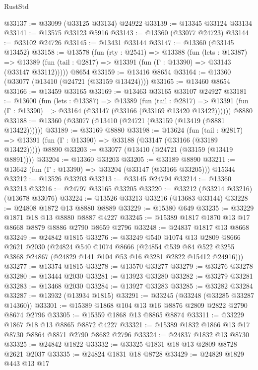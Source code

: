 \begin{lexlean}{RustStd}
\begin{coremodule}
@33137 := @33099 (@33125 @33134) @24922
@33139 := @13345 @33124 @33134
@33141 := @13575 @33123 @5916
@33143 := @13360 (@33077 @24723)
@33144 := @33102 @24726
@33145 := @13431 @33144
@33147 := @13360 (@33145 @13452)
@33158 := @13578
    (fun (rty : @2541) =>
    @13388
      (fun (lets : @13387) =>
      @13389 (fun (tail : @2817) => @13391 (fun (Γ : @13390) => @33143 (@33147 @33112)))))
    @8654
@33159 := @13416 @8654
@33164 := @13360 (@33077 (@13410 (@24721 (@33159 @13424))))
@33165 := @13460 @8654
@33166 := @13459 @33165
@33169 := @13463 @33165 @33107 @24927
@33181 := @13600
    (fun (lets : @13387) =>
    @13389
      (fun (tail : @2817) =>
      @13391 (fun (Γ : @13390) => @33164 (@33147 (@33166 (@33169 @13420 @13422))))))
    @8880
@33188 := @13360 (@33077 (@13410 (@24721 (@33159 (@13419 (@8881 @13422))))))
@33189 := @33169 @8880
@33198 := @13624
    (fun (tail : @2817) => @13391 (fun (Γ : @13390) => @33188 (@33147 (@33166 (@33189 @13422)))))
    @8890
@33203 := @33077 (@13410 (@24721 (@33159 (@13419 @8891))))
@33204 := @13360 @33203
@33205 := @33189 @8890
@33211 := @13642 (fun (Γ : @13390) => @33204 (@33147 (@33166 @33205))) @15344
@33212 := @13526 @33203
@33213 := @33145 @24794
@33214 := @13360 @33213
@33216 := @24797 @33165 @33205
@33220 := @33212 (@33214 @33216) (@13678 @33076)
@33224 := @13526 @33213 @33216 (@13683 @33144)
@33228 := @24808 @1872 @13 @8880 @8889
@33229 := @15380 @649
@33235 := @33229 @1871 @18 @13 @8880 @8887 @4227
@33245 := @15389 @1817 @1870 @13 @17 @8668 @8879 @8886 @2790 @8659 @2796
@33248 := @24837 @1817 @13 @8668
@33249 := @24842 @1815
@33276 := @33249
    @540
    @1074
    @13
    @2809
    @8666
    @2621
    @2030
    (@24824
      @540
      @1074
      @8666
      (@24854
        @539
        @84
        @522
        @3255
        @3868
        @24867
        (@24829 @141 @104 @53 @16 @3281 @2822 @15412 @24916)))
@33277 := @13374 @1815
@33278 := @13570 @33277
@33279 := @33276 @33278
@33280 := @13444 @2030
@33281 := @13923 @33280
@33282 := @33279 @33281
@33283 := @13468 @2030
@33284 := @13927 @33283
@33285 := @33282 @33284
@33287 := @13932 (@13934 @1815)
@33291 := @33245 (@33248 (@33285 @33287 @14360))
@33301 := @15389 @1868 @104 @13 @16 @8876 @2809 @2822 @2790 @8674 @2796
@33305 := @15359 @1868 @13 @8865 @8874
@33311 := @33229 @1867 @18 @13 @8865 @8872 @4227
@33321 := @15389 @1832 @1866 @13 @17 @8730 @8864 @8871 @2790 @8682 @2796
@33324 := @24837 @1832 @13 @8730
@33325 := @24842 @1822
@33332 := @33325 @1831 @18 @13 @2809 @8728 @2621 @2037
@33335 := @24824 @1831 @18 @8728
@33429 := @24829
    @1829
    @443
    @13
    @17

\end{coremodule}
\end{lexlean}
